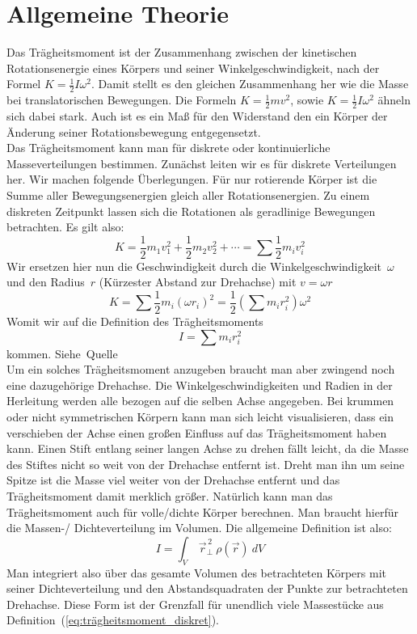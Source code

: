 \documentclass{article}
\begin{document}
	\section{Allgemeine Theorie}\label{Allgemeine_Theorie}
	Das Trägheitsmoment ist der Zusammenhang zwischen der kinetischen Rotationsenergie eines Körpers und seiner Winkelgeschwindigkeit, nach der Formel \(K = \frac{1}{2}I \omega^2\).
	Damit stellt es den gleichen Zusammenhang her wie die Masse bei translatorischen Bewegungen.
	Die Formeln \({K = \frac{1}{2} m v^2}\), sowie \({K = \frac{1}{2} I \omega^2} \) ähneln sich dabei stark.
	Auch ist es ein Maß für den Widerstand den ein Körper der Änderung seiner Rotationsbewegung entgegensetzt. \\
	Das Trägheitsmoment kann man für diskrete oder kontinuierliche Masseverteilungen bestimmen.
	Zunächst leiten wir es für diskrete Verteilungen her. Wir machen folgende Überlegungen.
	Für nur rotierende Körper ist die Summe aller Bewegungsenergien gleich aller Rotationsenergien.
	Zu einem diskreten Zeitpunkt lassen sich die Rotationen als geradlinige Bewegungen betrachten. Es gilt also:
	\begin{equation}
		K = \frac{1}{2} m_1 v_1^2 + \frac{1}{2} m_2 v_2^2 + \cdots = \sum \frac{1}{2} m_i v_i^2
	\end{equation}
	Wir ersetzen hier nun die Geschwindigkeit durch die Winkelgeschwindigkeit~\(\omega\) und den Radius~\(r\)
	(Kürzester Abstand zur Drehachse) mit \(v = \omega r\)
	\begin{equation}
		K = \sum \frac{1}{2} m_i {\left( \omega r_i \right)}^2 = \frac{1}{2} \left( \sum m_i r_i^2 \right) \omega^2
	\end{equation}
	Womit wir auf die Definition des Trägheitsmoments
	\begin{equation}\label{eq:trägheitsmoment_diskret}
		I = \sum m_i r_i^2
	\end{equation} kommen. Siehe~Quelle~\cite{HallidayPhysik} \\
	Um ein solches Trägheitsmoment anzugeben braucht man aber zwingend noch eine dazugehörige Drehachse.
	Die Winkelgeschwindigkeiten und Radien in der Herleitung werden alle bezogen auf die selben Achse angegeben.
	Bei krummen oder nicht symmetrischen Körpern kann man sich leicht visualisieren, dass ein verschieben der Achse einen großen Einfluss auf das Trägheitsmoment haben kann.
	Einen Stift entlang seiner langen Achse zu drehen fällt leicht, da die Masse des Stiftes nicht so weit von der Drehachse entfernt ist.
	Dreht man ihn um seine Spitze ist die Masse viel weiter von der Drehachse entfernt und das Trägheitsmoment damit merklich größer.
	Natürlich kann man das Trägheitsmoment auch für volle/dichte Körper berechnen. Man braucht hierfür die Massen-/ Dichteverteilung im Volumen. Die allgemeine Definition ist also:
	\begin{equation}
		I = \int_V \ \vec{r}_{\bot}^{\,2} \  \rho(\vec{r}) \ dV
	\end{equation}
	Man integriert also über das gesamte Volumen des betrachteten Körpers mit seiner Dichteverteilung und den Abstandsquadraten der Punkte zur betrachteten Drehachse. Diese Form ist der Grenzfall für unendlich viele Massestücke aus Definition~(\ref{eq:trägheitsmoment_diskret}).
	
\end{document}
